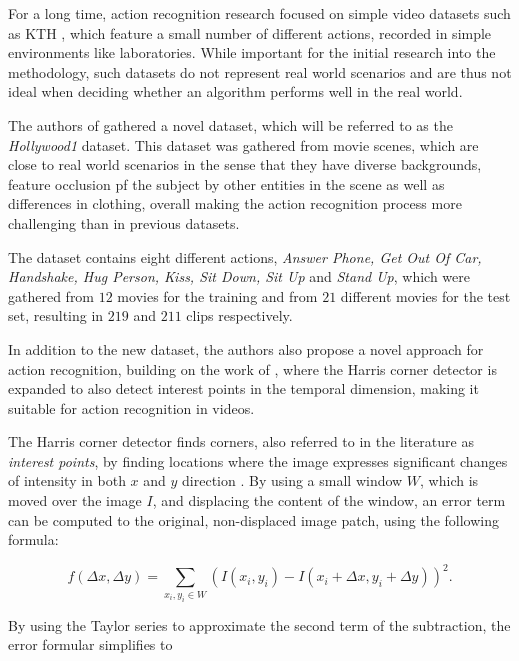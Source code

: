 For a long time, action recognition research focused on simple video datasets such as KTH \cite{schuldt_recognizing_2004}, which feature a small number of different actions, recorded in simple environments like laboratories.
While important for the initial research into the methodology, such datasets do not represent real world scenarios and are thus not ideal when deciding whether an algorithm performs well in the real world.

The authors of \cite{laptev_learning_2008} gathered a novel dataset, which will be referred to as the \textit{Hollywood1} dataset.
This dataset was gathered from movie scenes, which are close to real world scenarios in the sense that they have diverse backgrounds, feature occlusion pf the subject by other entities in the scene as well as differences in clothing, overall making the action recognition process more challenging than in previous datasets.

The dataset contains eight different actions, \textit{Answer Phone, Get Out Of Car, Handshake, Hug Person, Kiss, Sit Down, Sit Up} and \textit{Stand Up}, which were gathered from $12$ movies for the training and from $21$ different movies for the test set, resulting in $219$ and $211$ clips respectively.

In addition to the new dataset, the authors also propose a novel approach for action recognition, building on the work of \cite{laptev_harris3d}, where the Harris corner detector is expanded to also detect interest points in the temporal dimension, making it suitable for action recognition in videos.

The Harris corner detector \cite{harris_combined_1988} finds corners, also referred to in the literature as \textit{interest points}, by finding locations where the image expresses significant changes of intensity in both $x$ and $y$ direction \cite{laptev_harris3d}.
By using a small window $W$, which is moved over the image $I$, and displacing the content of the window, an error term can be computed to the original, non-displaced image patch, using the following formula:

\begin{equation}
    f(\Delta x, \Delta y) = \sum_{x_i, y_i \in W} (I(x_i,y_i) - I(x_i + \Delta x, y_i + \Delta y))^2.
\end{equation}

By using the Taylor series to approximate the second term of the subtraction, the error formular simplifies to

